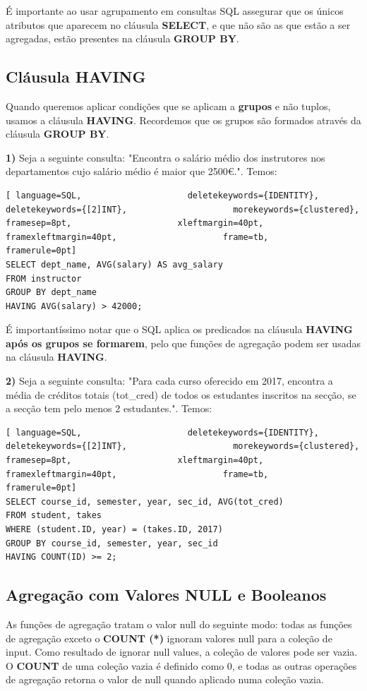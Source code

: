 \documentclass[titlepage]{book}
\theoremstyle{definition}
\begin{document}
É importante ao usar agrupamento em consultas SQL assegurar que os únicos atributos que aparecem no cláusula \textbf{SELECT}, e que não são as que estão a ser agregadas, estão presentes na cláusula \textbf{GROUP BY}.

\subsection{Cláusula HAVING}
Quando queremos aplicar condições que se aplicam a \textbf{grupos} e não tuplos, usamos a cláusula \textbf{HAVING}. Recordemos que os grupos são formados através da cláusula \textbf{GROUP BY}.

\textbf{1)} Seja a seguinte consulta: "Encontra o salário médio dos instrutores nos departamentos cujo salário médio é maior que 2500€.". Temos:
\begin{lstlisting}[ language=SQL,                     deletekeywords={IDENTITY},                     deletekeywords={[2]INT},                     morekeywords={clustered},                     framesep=8pt,                     xleftmargin=40pt,                     framexleftmargin=40pt,                     frame=tb,                     framerule=0pt]
SELECT dept_name, AVG(salary) AS avg_salary
FROM instructor
GROUP BY dept_name
HAVING AVG(salary) > 42000;
\end{lstlisting}
É importantíssimo notar que o SQL aplica os predicados na cláusula \textbf{HAVING} \textbf{após os grupos se formarem}, pelo que funções de agregação podem ser usadas na cláusula \textbf{HAVING}.

\textbf{2)} Seja a seguinte consulta: "Para cada curso oferecido em 2017, encontra a média de créditos totais (tot\_cred) de todos os estudantes inscritos na secção, se a secção tem pelo menos 2 estudantes.". Temos:
\begin{lstlisting}[ language=SQL,                     deletekeywords={IDENTITY},                     deletekeywords={[2]INT},                     morekeywords={clustered},                     framesep=8pt,                     xleftmargin=40pt,                     framexleftmargin=40pt,                     frame=tb,                     framerule=0pt]
SELECT course_id, semester, year, sec_id, AVG(tot_cred)
FROM student, takes
WHERE (student.ID, year) = (takes.ID, 2017)
GROUP BY course_id, semester, year, sec_id
HAVING COUNT(ID) >= 2;
\end{lstlisting}

\subsection{Agregação com Valores NULL e Booleanos}
As funções de agregação tratam o valor null do seguinte modo: todas as funções de agregação exceto o \textbf{COUNT (*)} ignoram valores null para a coleção de input. Como resultado de ignorar null values, a coleção de valores pode ser vazia. O \textbf{COUNT} de uma coleção vazia é definido como 0, e todas as outras operações de agregação retorna o valor de null quando aplicado numa coleção vazia.
\end{document}
